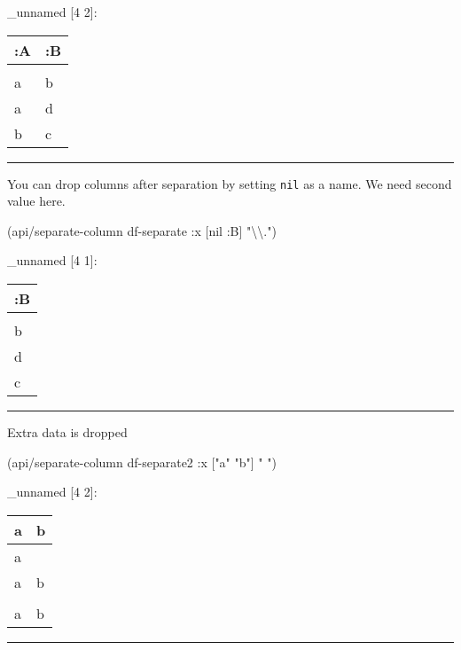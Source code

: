 \documentclass[]{article}
\newenvironment{Shaded}{\begin{snugshade}}{\end{snugshade}}
\newcommand{\StringTok}[1]{\textcolor[rgb]{0.31,0.60,0.02}{#1}}
\newcommand{\VariableTok}[1]{\textcolor[rgb]{0.00,0.00,0.00}{#1}}
\newcommand{\AttributeTok}[1]{\textcolor[rgb]{0.77,0.63,0.00}{#1}}
\newcommand{\NormalTok}[1]{#1}
\begin{document}
\_unnamed {[}4 2{]}:

\begin{longtable}[]{@{}ll@{}}
\toprule
:A & :B\tabularnewline
\midrule
\endhead
&\tabularnewline
a & b\tabularnewline
a & d\tabularnewline
b & c\tabularnewline
\bottomrule
\end{longtable}

\begin{center}\rule{0.5\linewidth}{0.5pt}\end{center}

You can drop columns after separation by setting \texttt{nil} as a name.
We need second value here.

\begin{Shaded}
\begin{Highlighting}[]
\NormalTok{(api/separate-column df-separate }\AttributeTok{:x}\NormalTok{ [}\VariableTok{nil} \AttributeTok{:B}\NormalTok{] }\StringTok{"}\NormalTok{\textbackslash{}\textbackslash{}}\StringTok{."}\NormalTok{)}
\end{Highlighting}
\end{Shaded}

\_unnamed {[}4 1{]}:

\begin{longtable}[]{@{}l@{}}
\toprule
:B\tabularnewline
\midrule
\endhead
\tabularnewline
b\tabularnewline
d\tabularnewline
c\tabularnewline
\bottomrule
\end{longtable}

\begin{center}\rule{0.5\linewidth}{0.5pt}\end{center}

Extra data is dropped

\begin{Shaded}
\begin{Highlighting}[]
\NormalTok{(api/separate-column df-separate2 }\AttributeTok{:x}\NormalTok{ [}\StringTok{"a"} \StringTok{"b"}\NormalTok{] }\StringTok{" "}\NormalTok{)}
\end{Highlighting}
\end{Shaded}

\_unnamed {[}4 2{]}:

\begin{longtable}[]{@{}ll@{}}
\toprule
a & b\tabularnewline
\midrule
\endhead
a &\tabularnewline
a & b\tabularnewline
&\tabularnewline
a & b\tabularnewline
\bottomrule
\end{longtable}

\begin{center}\rule{0.5\linewidth}{0.5pt}\end{center}
\end{document}
